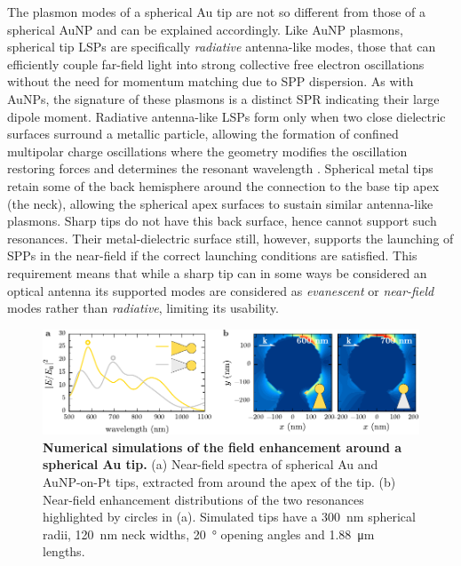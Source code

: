 \documentclass{article}
\begin{document}
The plasmon modes of a spherical Au tip are not so different from those of a spherical AuNP and can be explained accordingly. Like AuNP plasmons, spherical tip LSPs are specifically \emph{radiative} antenna-like modes, those that can efficiently couple far-field light into strong collective free electron oscillations without the need for momentum matching due to SPP dispersion. As with AuNPs, the signature of these plasmons is a distinct SPR indicating their large dipole moment. Radiative antenna-like LSPs form only when two close dielectric surfaces surround a metallic particle, allowing the formation of confined multipolar charge oscillations where the geometry modifies the oscillation restoring forces and determines the resonant wavelength \cite{mock2002, kuwata2003}. Spherical metal tips retain some of the back hemisphere around the connection to the base tip apex (the neck), allowing the spherical apex surfaces to sustain similar antenna-like plasmons. Sharp tips do not have this back surface, hence cannot support such resonances.
Their metal-dielectric surface still, however, supports the launching of SPPs in the near-field if the correct launching conditions are satisfied. This requirement means that while a sharp tip can in some ways be considered an optical antenna its supported modes are considered as \emph{evanescent} or \emph{near-field} modes rather than \emph{radiative}, limiting its usability.

\begin{figure}[bt]
\centering
\includegraphics{figures/spherical_tip_simulations}
\caption[Numerical simulations of the field enhancement around a spherical Au tip]{\textbf{Numerical simulations of the field enhancement around a spherical Au tip.} (a) Near-field spectra of spherical Au and AuNP-on-Pt tips, extracted from around the apex of the tip. (b) Near-field enhancement distributions of the two resonances highlighted by circles in (a). Simulated tips have a \SI{300}{nm} spherical radii, \SI{120}{nm} neck widths, \SI{20}{\degree} opening angles and \SI{1.88}{\micro\metre} lengths.}
\label{fig:spherical_tip_simulations}
\end{figure}
\end{document}
